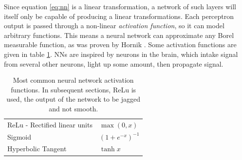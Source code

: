 \documentclass[12pt,a4paper]{article}
\begin{document}
Since equation \ref{eq:nn} is a linear transformation, a network of such layers will itself only be capable of producing a linear transformations. Each perceptron output is passed through a non-linear \emph{activation function}, so it can model arbitrary functions. This means a neural network can approximate any Borel measurable function, as was proven by Hornik \cite{hornik_multilayer_1989}. Some activation functions are given in table \ref{tab:acfns}. NNs are inspired by neurons in the brain, which intake signal from several other neurons, light up some amount, then propagate signal.

\begin{table}[hb] 
    \centering
    \begin{tabular}{|l|l|} \hline
        ReLu - Rectified linear units & $\max (0,x)$                         \\%
        Sigmoid                       & $ \left( 1+ e^{-x} \right  )^{-1}$  \\%
        Hyperbolic Tangent              & $\tanh{x}$                        \\\hline
\end{tabular}
\caption{Most common neural network activation functions. In subsequent sections, ReLu is used, the output of the network to be jagged and not smooth.}
\label{tab:acfns}
\end{table}
\end{document}
